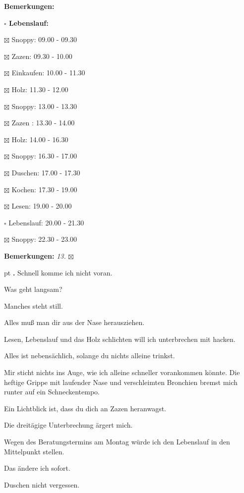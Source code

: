 \documentclass[10pt,a4paper]{article}
\newcounter{notec}
\newcommand\notep[1]{%
  \stepcounter{notec}
  \vskip #1pt
  {\bf\arabic{notec}.}
}
\newcommand\prop[1] {{\color {alizarin} {\bf #1}}}             %
\newcommand\mand[1] {{\color {burntorange} {\bf #1}}}          %
\newcommand\bottomspace{\vskip 4pt}
\newcommand\n[1] { {\sl #1.} \hskip 5pt }
\begin{document}
\begin{mdframed}[style=daystyle]
\begin{labeling}{{\mand {Bemerkungen:}}}
\begin{minipage}{0.75\textwidth}
\begin{labeling}{\prop {$\square$ {Lebenslauf:}}}
        \setlength\itemsep{-3pt}
      \item[$\boxtimes$ Snoppy:]     09.00 - 09.30        
      \item[$\boxtimes$ Zazen:]      09.30 - 10.00        
      \item[$\boxtimes$ Einkaufen:]  10.00 - 11.30        
      \item[$\boxtimes$ Holz:]       11.30 - 12.00
      \item[$\boxtimes$ Snoppy:]     13.00 - 13.30
      \item[$\boxtimes$ Zazen  :]    13.30 - 14.00
      \item[$\boxtimes$ Holz:]       14.00 - 16.30
      \item[$\boxtimes$ Snoppy:]     16.30 - 17.00
      \item[$\boxtimes$ Duschen:]    17.00 - 17.30
      \item[$\boxtimes$ Kochen:]     17.30 - 19.00        
      \item[$\boxtimes$ Lesen:]      19.00 - 20.00        
      \item[$\square$ Lebenslauf:]   20.00 - 21.30        
      \item[$\boxtimes$ Snoppy:]     22.30 - 23.00
      \end{labeling}
    \end{minipage}
    \bottomspace
  \item[{\mand {Bemerkungen:}}]     \n{13} $\boxtimes$
  \end{labeling}
    
  \setcounter{notec}{0}
  
  \notep 0 Schnell komme ich nicht voran.

  \vskip 2pt
  Was geht langsam?

  \vskip 2pt
  Manches steht still.

  \vskip 2pt
  Alles muß man dir aus der Nase herausziehen.

  \vskip 2pt
  Lesen, Lebenslauf und das Holz schlichten will ich unterbrechen mit hacken.

  \vskip 2pt
  Alles ist nebensächlich, solange du nichts alleine trinkst.

  \vskip 2pt
  Mir sticht nichts ins Auge, wie ich alleine schneller vorankommen könnte. Die
  heftige Grippe mit laufender Nase und verschleimten Bronchien bremst mich
  runter auf ein Schneckentempo.

  \vskip 2pt
  Ein Lichtblick ist, dass du dich an Zazen heranwagst.

  \vskip 2pt
  Die dreitägige Unterbrechung ärgert mich.

  \vskip 2pt
  Wegen des Beratungstermins am Montag würde ich den Lebenslauf in den Mittelpunkt stellen.

  \vskip 2pt
  Das ändere ich sofort.

  \vskip 2pt
  Duschen nicht vergessen.

\end{mdframed}
\end{document}
